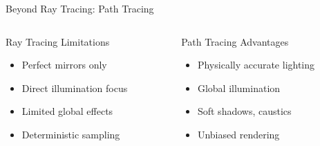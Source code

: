 \begin{frame}{Beyond Ray Tracing: Path Tracing}
    \begin{columns}
        \begin{column}{0.5\textwidth}
            \begin{raybox}{Ray Tracing Limitations}
                \begin{itemize}
                    \item Perfect mirrors only
                    \item Direct illumination focus
                    \item Limited global effects
                    \item Deterministic sampling
                \end{itemize}
            \end{raybox}
        \end{column}
        \begin{column}{0.5\textwidth}
            \begin{raybox}{Path Tracing Advantages}
                \begin{itemize}
                    \item Physically accurate lighting
                    \item Global illumination
                    \item Soft shadows, caustics
                    \item Unbiased rendering
                \end{itemize}
            \end{raybox}
        \end{column}
    \end{columns}
\end{frame}

